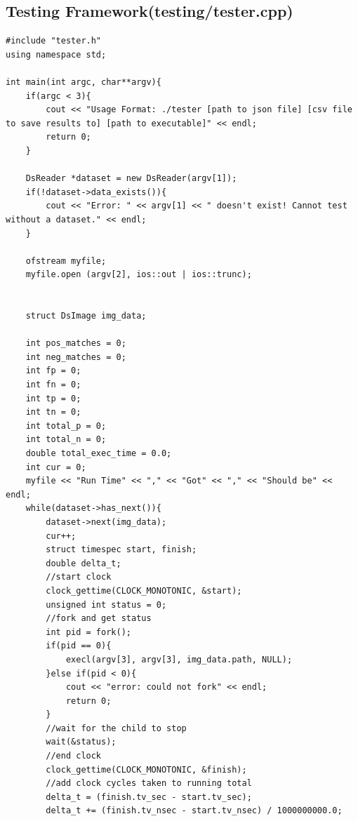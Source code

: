 \documentclass[letterpaper,10pt,titlepage]{article}
\begin{document}
\subsection*{Testing Framework(testing/tester.cpp)}
\begin{lstlisting}
#include "tester.h"
using namespace std;

int main(int argc, char**argv){
    if(argc < 3){
        cout << "Usage Format: ./tester [path to json file] [csv file to save results to] [path to executable]" << endl;
        return 0;
    }
    
    DsReader *dataset = new DsReader(argv[1]);
    if(!dataset->data_exists()){
        cout << "Error: " << argv[1] << " doesn't exist! Cannot test without a dataset." << endl;
    }

    ofstream myfile;
    myfile.open (argv[2], ios::out | ios::trunc);


    struct DsImage img_data;

    int pos_matches = 0;
    int neg_matches = 0;
    int fp = 0;
    int fn = 0;
    int tp = 0;
    int tn = 0;
    int total_p = 0;
    int total_n = 0;
    double total_exec_time = 0.0;
    int cur = 0;
    myfile << "Run Time" << "," << "Got" << "," << "Should be" << endl;
    while(dataset->has_next()){
        dataset->next(img_data);
        cur++;
        struct timespec start, finish;
        double delta_t;
        //start clock
        clock_gettime(CLOCK_MONOTONIC, &start); 
        unsigned int status = 0;
        //fork and get status
        int pid = fork();
        if(pid == 0){
            execl(argv[3], argv[3], img_data.path, NULL); 
        }else if(pid < 0){
            cout << "error: could not fork" << endl;
            return 0;
        }
        //wait for the child to stop
        wait(&status);
        //end clock
        clock_gettime(CLOCK_MONOTONIC, &finish);
        //add clock cycles taken to running total
        delta_t = (finish.tv_sec - start.tv_sec);
        delta_t += (finish.tv_nsec - start.tv_nsec) / 1000000000.0;


\end{lstlisting}
\end{document}
